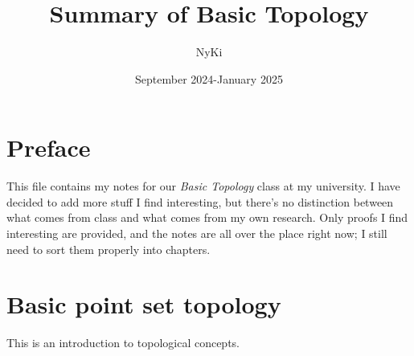 \documentclass[a4paper]{article}
\author{NyKi}
\title{Summary of Basic Topology}
\date{September 2024-January 2025}
\begin{document}
\maketitle
\tableofcontents
\section{Preface}
This file contains my notes for our \textit{Basic Topology} class at my university. I have decided to add more stuff I find interesting, but there's no distinction between what comes from class and what comes from my own research. Only proofs I find interesting are provided, and the notes are all over the place right now; I still need to sort them properly into chapters.
\section{Basic point set topology}
This is an introduction to topological concepts.
\end{document}
